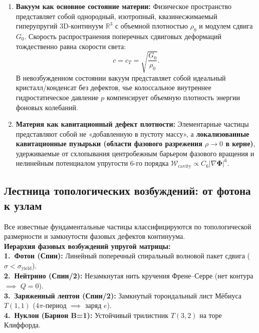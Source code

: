 \documentclass[11pt,a4paper]{article}
\theoremstyle{definition}
\theoremstyle{remark}
\begin{document}
\begin{enumerate}
    \item \textbf{Вакуум как основное состояние материи:} Физическое пространство представляет собой однородный, изотропный, квазинесжимаемый гиперупругий 3D-континуум $\mathbb{R}^3$ с объемной плотностью $\rho_0$ и модулем сдвига $G_0$. Скорость распространения поперечных сдвиговых деформаций тождественно равна скорости света:
    \begin{equation}
        c = c_T = \sqrt{\frac{G_0}{\rho_0}}.
    \end{equation}
    В невозбужденном состоянии вакуум представляет собой идеальный кристалл/конденсат без дефектов, чье колоссальное внутреннее гидростатическое давление $p$ компенсирует объемную плотность энергии фоновых колебаний.
    
    \item \textbf{Материя как кавитационный дефект плотности:} Элементарные частицы представляют собой не «добавленную в пустоту массу», а \textbf{локализованные кавитационные пузырьки (области фазового разрежения $\rho \to 0$ в керне)}, удерживаемые от схлопывания центробежным барьером фазового вращения и нелинейным потенциалом упругости 6-го порядка $\mathcal{W}_{\mathrm{cavity}} \propto C_6 |\nabla \boldsymbol{\Phi}|^6$.
\end{enumerate}

\subsection{Лестница топологических возбуждений: от фотона к узлам}
Все известные фундаментальные частицы классифицируются по топологической размерности и замкнутости фазовых дефектов континуума.\\ 
\textbf{Иерархия фазовых возбуждений упругой матрицы:}\\[1.5mm]
    \textbf{1.\ Фотон\; (Спин):} Линейный поперечный спиральный волновой пакет сдвига ($\sigma < \sigma_{\mathrm{yield}}$).\\[1mm]
    \textbf{2.\ Нейтрино\; (Спин/2):} Незамкнутая нить кручения Френе--Серре (нет контура $\implies$ $Q=0$).\\[1mm]
    \textbf{3.\ Заряженный лептон\; (Спин/2):} Замкнутый тороидальный лист Мёбиуса $T(1,1)$ ($4\pi$-период $\implies$ заряд $e$).\\[1mm]
    \textbf{4.\ Нуклон (Барион\; B=1):} Устойчивый трилистник $T(3,2)$ на торе Клиффорда.
  
\end{document}

